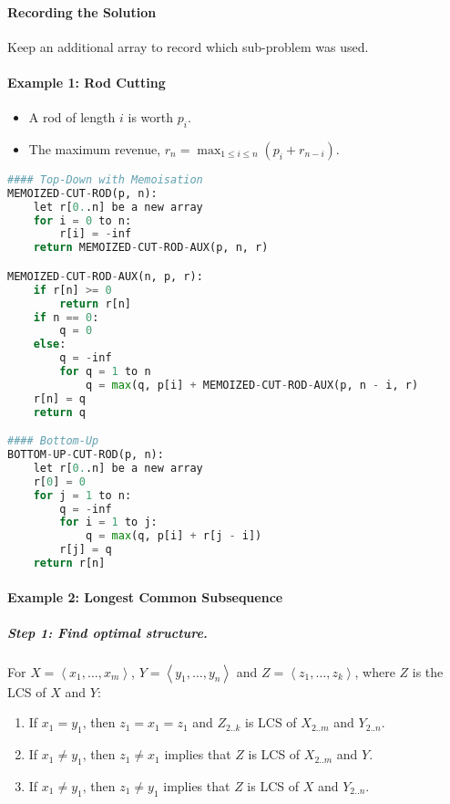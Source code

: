 \documentclass[twocolumn,english]{article}
\begin{document}
\paragraph{Recording the Solution}

Keep an additional array to record which sub-problem was used.

\paragraph{Example 1: Rod Cutting}
\begin{itemize}
\item A rod of length $i$ is worth $p_{i}$.
\item The maximum revenue, $r_{n}=\max_{1\leq i\leq n}\left(p_{i}+r_{n-i}\right)$.
\end{itemize}
\begin{lstlisting}[language=Python,basicstyle={\footnotesize\ttfamily},tabsize=4,frame=single]
#### Top-Down with Memoisation
MEMOIZED-CUT-ROD(p, n):
	let r[0..n] be a new array
	for i = 0 to n:
		r[i] = -inf
	return MEMOIZED-CUT-ROD-AUX(p, n, r)

MEMOIZED-CUT-ROD-AUX(n, p, r):
	if r[n] >= 0
		return r[n]
	if n == 0:
		q = 0
	else:
		q = -inf
		for q = 1 to n
			q = max(q, p[i] + MEMOIZED-CUT-ROD-AUX(p, n - i, r)
	r[n] = q
	return q

#### Bottom-Up
BOTTOM-UP-CUT-ROD(p, n):
	let r[0..n] be a new array
	r[0] = 0
	for j = 1 to n:
		q = -inf
		for i = 1 to j:
			q = max(q, p[i] + r[j - i])
		r[j] = q
	return r[n]
\end{lstlisting}

\paragraph{Example 2: Longest Common Subsequence}

\subparagraph{Step 1: Find optimal structure.}

For $X=\left\langle x_{1},\dots,x_{m}\right\rangle $, $Y=\left\langle y_{1},\dots,y_{n}\right\rangle $
and $Z=\left\langle z_{1},\dots,z_{k}\right\rangle $, where $Z$
is the LCS of $X$ and $Y$:
\begin{enumerate}
\item If $x_{1}=y_{1}$, then $z_{1}=x_{1}=z_{1}$ and $Z_{2..k}$ is LCS
of $X_{2..m}$ and $Y_{2..n}$.
\item If $x_{1}\neq y_{1}$, then $z_{1}\neq x_{1}$ implies that $Z$ is
LCS of $X_{2..m}$ and $Y$.
\item If $x_{1}\neq y_{1}$, then $z_{1}\neq y_{1}$ implies that $Z$ is
LCS of $X$ and $Y_{2..n}$.
\end{enumerate}
\end{document}

